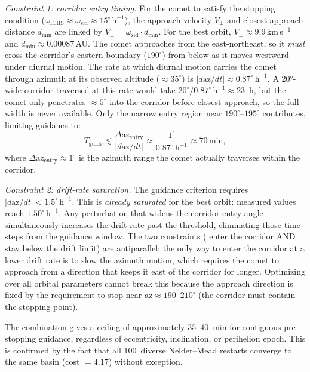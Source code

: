 \documentclass[11pt,a4paper]{article}
\begin{document}
\textit{Constraint 1: corridor entry timing.}
For the comet to satisfy the stopping condition ($\omega_\mathrm{ICRS} \approx
\omega_\mathrm{sid} \approx 15^\circ\,\mathrm{h}^{-1}$), the approach velocity
$V_\perp$ and closest-approach distance $d_\mathrm{min}$ are linked by
$V_\perp = \omega_\mathrm{sid} \cdot d_\mathrm{min}$. For the best orbit,
$V_\perp \approx 9.9$\,km\,s$^{-1}$ and $d_\mathrm{min} \approx 0.00087$\,AU.
The comet approaches from the east-northeast, so it \emph{must} cross the
corridor's eastern boundary ($190^\circ$) from below as it moves westward under
diurnal motion. The rate at which diurnal motion carries the comet through
azimuth at its observed altitude ($\approx\!35^\circ$) is $|d\mathrm{az}/dt|
\approx 0.87^\circ\,\mathrm{h}^{-1}$. A 20°-wide corridor traversed at this
rate would take $20^\circ / 0.87^\circ\,\mathrm{h}^{-1} \approx 23$~h, but
the comet only penetrates $\approx\!5^\circ$ into the corridor before closest
approach, so the full width is never available.
Only the narrow entry region near $190^\circ$--$195^\circ$ contributes, limiting guidance to:
\begin{equation}
  T_\mathrm{guide} \lesssim \frac{\Delta\mathrm{az}_\mathrm{entry}}{|d\mathrm{az}/dt|}
  \approx \frac{1^\circ}{0.87^\circ\,\mathrm{h}^{-1}} \approx 70\,\mathrm{min},
  \label{eq:Tguide_corridor}
\end{equation}
where $\Delta\mathrm{az}_\mathrm{entry} \approx 1^\circ$ is the azimuth
range the comet actually traverses within the corridor.

\textit{Constraint 2: drift-rate saturation.}
The guidance criterion requires $|d\mathrm{az}/dt| < 1.5^\circ\,\mathrm{h}^{-1}$.
This is \emph{already saturated} for the best orbit: measured values reach
$1.50^\circ\,\mathrm{h}^{-1}$. Any perturbation that widens the corridor entry
angle simultaneously increases the drift rate past the threshold, eliminating
those time steps from the guidance window. The two constraints (
enter the corridor AND stay below the drift limit) are antiparallel: the
only way to enter the corridor at a lower drift rate is to slow the azimuth
motion, which requires the comet to approach from a direction that keeps it
east of the corridor for longer. Optimizing over all orbital parameters cannot
break this because the approach direction is fixed by the requirement to stop
near $\mathrm{az}\!\approx\!190$--$210^\circ$ (the corridor must contain the
stopping point).

The combination gives a ceiling of approximately $35$--$40$~min for contiguous
pre-stopping guidance, regardless of eccentricity, inclination, or perihelion
epoch. This is confirmed by the fact that all 100~diverse Nelder--Mead restarts
converge to the same basin (cost $= 4.17$) without exception.
\end{document}
